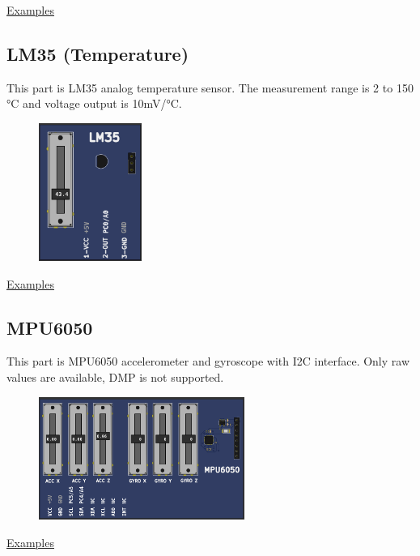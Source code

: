 \href{https://lcgamboa.github.io/picsimlab_examples/examples/examples_index.html\#Keypad}{Examples}

\subsection{LM35 (Temperature)}

This part is LM35 analog temperature sensor. The measurement range is 2 to 150 °C  and 
voltage output is 10mV/°C.

\begin{figure}[H]
\center
\includegraphics[width=0.3\textwidth]{img/part_lm35.png} 
\end{figure} 


\href{https://lcgamboa.github.io/picsimlab_examples/examples/examples_index.html\#LM35_(Temperature)}{Examples}


\subsection{MPU6050}

This part is MPU6050 accelerometer and gyroscope with I2C interface. 
Only raw values are available, DMP is not supported.

\begin{figure}[H]
\center
\includegraphics[width=0.6\textwidth]{img/part_mpu6050.png} 
\end{figure} 


\href{https://lcgamboa.github.io/picsimlab_examples/examples/examples_index.html\#MPU6050}{Examples}

